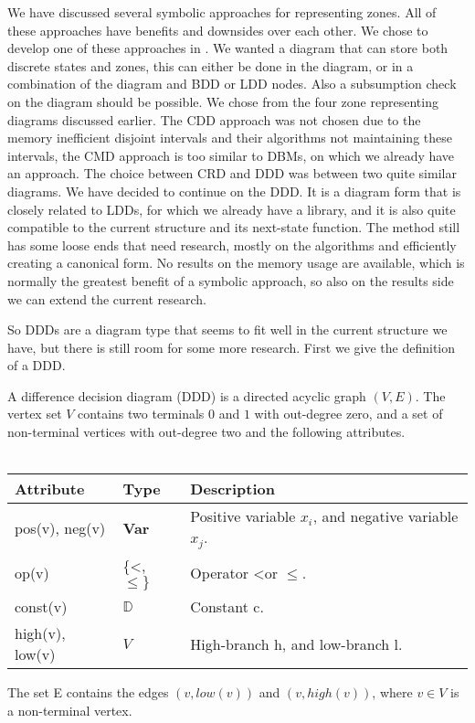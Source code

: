 We have discussed several symbolic approaches for representing zones. All of these approaches have benefits and downsides over each other. We chose to develop one of these approaches in \ltsmin{}. We wanted a diagram that can store both discrete states and zones, this can either be done in the diagram, or in a combination of the diagram and BDD or LDD nodes. Also a subsumption check on the diagram should be possible. We chose from the four zone representing diagrams discussed earlier. The CDD approach was not chosen due to the memory inefficient disjoint intervals and their algorithms not maintaining these intervals, the CMD approach is too similar to DBMs, on which we already have an approach. The choice between CRD and DDD was between two quite similar diagrams. We have decided to continue on the DDD. It is a diagram form that is closely related to LDDs, for which we already have a library, and it is also quite compatible to the current \pins{} structure and its next-state function. The method still has some loose ends that need research, mostly on the algorithms and efficiently creating a canonical form. No results on the memory usage are available, which is normally the greatest benefit of a symbolic approach, so also on the results side we can extend the current research. 

So DDDs are a diagram type that seems to fit well in the current structure we have, but there is still room for some more research. First we give the definition of a DDD.

\begin{mydef}
\label{def:DDD}
A difference decision diagram (DDD) is a directed acyclic graph $(V,E)$. The vertex set $V$ contains two terminals $0$ and $1$ with out-degree zero, and a set of non-terminal vertices with out-degree two and the following attributes.
\\\\
\begin{tabular}{lll}
Attribute                & Type                      & Description                                           \\\hline
pos(v), neg(v)           & \textbf{Var}              & Positive variable $x_i$, and negative variable $x_j$. \\
op(v)                    & \{\textless, $\leq\}$     & Operator \textless or $\leq$.                         \\
const(v)                 & $\mathbb{D}$              & Constant c.                                           \\
high(v), low(v)          & $V$                       & High-branch h, and low-branch l.                   
\end{tabular}
The set E contains the edges $(v,low(v))$ and $(v, high(v))$, where $v \in V$ is a non-terminal vertex.
\end{mydef}

